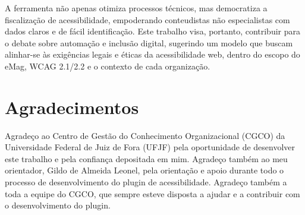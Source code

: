 \documentclass[12pt]{article}
\begin{document}
A ferramenta não apenas otimiza processos técnicos, mas democratiza
a fiscalização de acessibilidade, empoderando conteudistas não especialistas
com dados claros e de fácil identificação. Este trabalho visa, portanto, contribuir
para o debate sobre automação e inclusão digital, sugerindo um modelo que buscam alinhar-se às exigências legais e éticas da
acessibilidade web, dentro do escopo do eMag, WCAG 2.1/2.2 e o contexto de cada
organização.

\section{Agradecimentos}
Agradeço ao Centro de Gestão do Conhecimento Organizacional (CGCO) da
Universidade Federal de Juiz de Fora (UFJF) pela oportunidade de
desenvolver este trabalho e pela confiança depositada em mim. Agradeço
também ao meu orientador, Gildo de Almeida Leonel, pela orientação e 
apoio durante todo o processo de desenvolvimento do plugin de
acessibilidade. Agradeço também a toda a equipe do CGCO, que sempre
esteve disposta a ajudar e a contribuir com o desenvolvimento do
plugin.

\nocite{*}
\printbibliography[title={Referências}]
\end{document}
